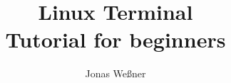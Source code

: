 \documentclass{article}
\begin{document}
\title{Linux Terminal \textendash\\
  Tutorial for beginners}
\author{Jonas Weßner}
\maketitle
\tableofcontents
\newpage				%

\newpage
\newpage
\newpage
\newpage
\newpage
\newpage
\newpage
\newpage
\newpage

\end{document}
